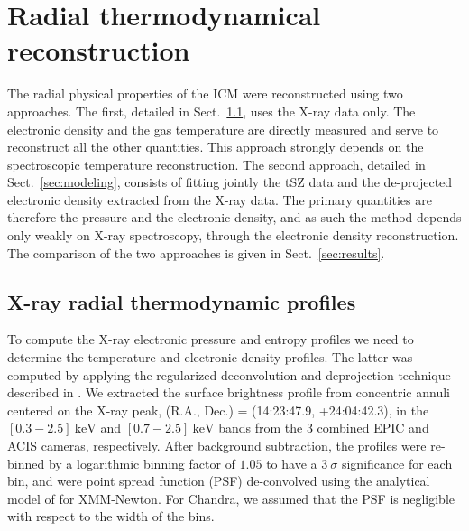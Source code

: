 \documentclass[twocolumn,traditabstract]{aa}
\begin{document}
\section{Radial thermodynamical reconstruction}\label{sec:Radial_pressure_reconstruction}
The radial physical properties of the ICM were reconstructed using two approaches. The first, detailed in Sect.~\ref{sec:X_ray_extraction_of_the_cluster_radial_thermodynamic_profiles}, uses the X-ray data only. The electronic density and the gas temperature are directly measured and serve to reconstruct all the other quantities. This approach strongly depends on the spectroscopic temperature reconstruction. The second approach, detailed in Sect.~\ref{sec:modeling}, consists of fitting jointly the tSZ data and the de-projected electronic density extracted from the X-ray data. The primary quantities are therefore the pressure and the electronic density, and as such the method depends only weakly on X-ray spectroscopy, through the electronic density reconstruction. The comparison of the two approaches is given in Sect.~\ref{sec:results}.

\subsection{X-ray radial thermodynamic profiles}\label{sec:X_ray_extraction_of_the_cluster_radial_thermodynamic_profiles}
To compute the X-ray electronic pressure and entropy profiles we need to determine the temperature and electronic density profiles. The latter was computed by applying the regularized deconvolution and deprojection technique described in \cite{croston2006}. We extracted the surface brightness profile from concentric annuli centered on the X-ray peak, (R.A., Dec.) = (14:23:47.9, +24:04:42.3), in the $[0.3-2.5] \ \si{\kilo\electronvolt}$ and $[0.7-2.5] \ \si{\kilo\electronvolt}$ bands from the $3$ combined EPIC and ACIS cameras, respectively. After background subtraction, the profiles were re-binned by a logarithmic binning factor of $1.05$ to have a $3 \ \sigma$ significance for each bin, and were point spread function (PSF) de-convolved using the analytical model of \cite{ghizzardi2001} for XMM-Newton. For Chandra, we assumed that the PSF is negligible with respect to the width of the bins. 
\end{document}
